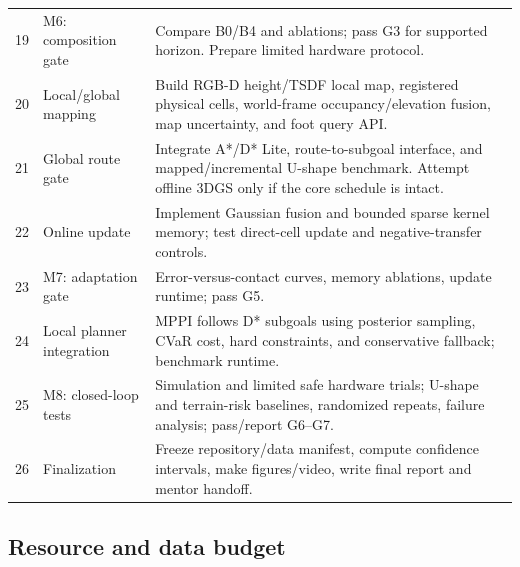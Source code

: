 \begin{longtable}{@{}C{16mm}L{39mm}p{88mm}@{}}
19 & M6: composition gate & Compare B0/B4 and ablations; pass G3 for supported horizon. Prepare limited hardware protocol.\\
20 & Local/global mapping & Build RGB-D height/TSDF local map, registered physical cells, world-frame occupancy/elevation fusion, map uncertainty, and foot query API.\\
21 & Global route gate & Integrate A*/D* Lite, route-to-subgoal interface, and mapped/incremental U-shape benchmark. Attempt offline 3DGS only if the core schedule is intact.\\
22 & Online update & Implement Gaussian fusion and bounded sparse kernel memory; test direct-cell update and negative-transfer controls.\\
23 & M7: adaptation gate & Error-versus-contact curves, memory ablations, update runtime; pass G5.\\
24 & Local planner integration & MPPI follows D* subgoals using posterior sampling, CVaR cost, hard constraints, and conservative fallback; benchmark runtime.\\
25 & M8: closed-loop tests & Simulation and limited safe hardware trials; U-shape and terrain-risk baselines, randomized repeats, failure analysis; pass/report G6--G7.\\
26 & Finalization & Freeze repository/data manifest, compute confidence intervals, make figures/video, write final report and mentor handoff.\\
\bottomrule
\end{longtable}

\subsection{Resource and data budget}

